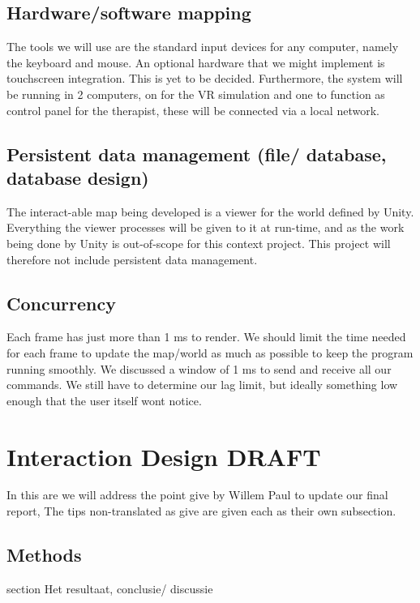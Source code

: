 \documentclass[11pt]{article}
\begin{document}
    \subsection{Hardware/software mapping }
    The tools we will use are the standard input devices for any computer, namely the keyboard and mouse. An optional hardware that we might implement is touchscreen integration. This is yet to be decided.
    Furthermore, the system will be running in 2 computers, on for the VR simulation and one to function as control panel for the therapist, these will be connected via a local network.
    
    \subsection{Persistent data management (file/ database, database design)}
    The interact-able map being developed is a viewer for the world defined by Unity. Everything the viewer processes will be given to it at run-time, and as the work being done by Unity is out-of-scope for this context project. This project will therefore not include persistent data management.
    
    \subsection{Concurrency}
    Each frame has just more than 1 ms to render. We should limit the time needed for each frame to update the map/world as much as possible to keep the program running smoothly. We discussed a window of 1 ms to send and receive all our commands. 
    We still have to determine our lag limit, but ideally something low enough that the user itself wont notice. 

\section{Interaction Design DRAFT }
In this are we will address the point give by Willem Paul to update our final report, The tips non-translated as give are given each as their own subsection.

\subsection{Methods} section
Het resultaat, conclusie/ discussie
\end{document}
